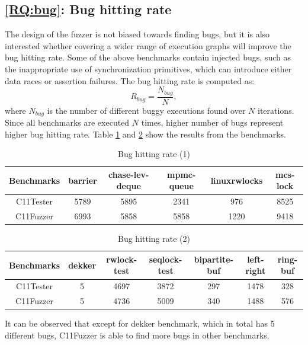 \subsection{\ref*{RQ:bug}: Bug hitting rate}

The design of the fuzzer is not biased towards finding bugs, but it is also interested whether covering a wider range of execution graphs will improve the bug hitting rate. Some of the above benchmarks contain injected bugs, such as the inappropriate use of synchronization primitives, which can introduce either data races or assertion failures. The bug hitting rate is computed as:
\[
	R_{bug} = \frac{N_{bug}}{N},
\]
where $N_{bug}$ is the number of different buggy executions found over $N$ iterations. Since all benchmarks are executed $N$ times, higher number of bugs represent higher bug hitting rate. Table \ref{buggy1} and \ref{buggy2} show the results from the benchmarks.


\begin{table}[h!]
	\begin{tabular}{ |c|ccccc| }
		\hline
		Benchmarks & barrier & chase-lev-deque & mpmc-queue & linuxrwlocks & mcs-lock \\
		\hline
		C11Tester  & 5789    & 5895            & 2341       & 976          & 8525     \\
		C11Fuzzer  & 6993    & 5858            & 5858       & 1220         & 9418     \\
		\hline
	\end{tabular}
	\caption{Bug hitting rate (1)}
	\label{buggy1}

\end{table}

\begin{table}[h!]
	\begin{tabular}{ |c|cccccc| }
		\hline
		Benchmarks & dekker & rwlock-test & seqlock-test & bipartite-buf & left-right & ring-buf \\
		\hline
		C11Tester  & 5      & 4697        & 3872         & 297           & 1478       & 328      \\
		C11Fuzzer  & 5      & 4736        & 5009         & 340           & 1488       & 576      \\
		\hline
	\end{tabular}
	\caption{Bug hitting rate (2)}
	\label{buggy2}
\end{table}

It can be observed that except for dekker benchmark, which in total has 5 different bugs, C11Fuzzer is able to find more bugs in other benchmarks.


